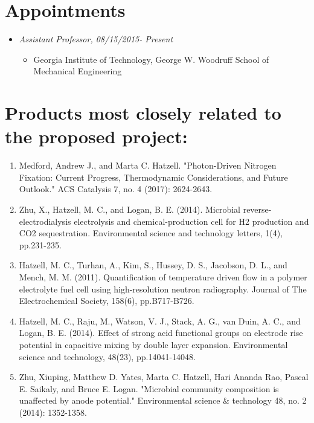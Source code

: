 \section{Appointments}\label{MCH-appointments}

\begin{itemize}
\itemsep1pt\parskip0pt
\item
  \emph{Assistant Professor, 08/15/2015- Present}

  \begin{itemize}
  \itemsep1pt\parskip0pt
  \item
    Georgia Institute of Technology, George W. Woodruff School of Mechanical Engineering
  \end{itemize}
\end{itemize}

\section{Products most closely related to the proposed
project:}\label{MCH-products-most-closely-related-to-the-proposed-project}

\begin{enumerate}
\def\labelenumi{\arabic{enumi}.}
\item
Medford, Andrew J., and Marta C. Hatzell. "Photon-Driven Nitrogen Fixation: Current Progress, Thermodynamic Considerations, and Future Outlook." ACS Catalysis 7, no. 4 (2017): 2624-2643.
\item
Zhu, X., Hatzell, M. C., and Logan, B. E. (2014). Microbial reverse-electrodialysis electrolysis and chemical-production cell for H2 production and CO2 sequestration. Environmental science and technology letters, 1(4), pp.231-235.
\item
Hatzell, M. C., Turhan, A., Kim, S., Hussey, D. S., Jacobson, D. L., and Mench, M. M. (2011). Quantification of temperature driven flow in a polymer electrolyte fuel cell using high-resolution neutron radiography. Journal of The Electrochemical Society, 158(6), pp.B717-B726.
\item
Hatzell, M. C., Raju, M., Watson, V. J., Stack, A. G., van Duin, A. C., and Logan, B. E. (2014). Effect of strong acid functional groups on electrode rise potential in capacitive mixing by double layer expansion. Environmental science and technology, 48(23), pp.14041-14048.
\item
Zhu, Xiuping, Matthew D. Yates, Marta C. Hatzell, Hari Ananda Rao, Pascal E. Saikaly, and Bruce E. Logan. "Microbial community composition is unaffected by anode potential." Environmental science \& technology 48, no. 2 (2014): 1352-1358.
\end{enumerate}

